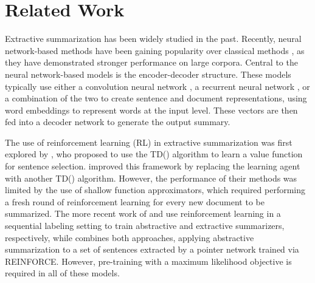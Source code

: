 \documentclass[11pt,a4paper]{article}
\begin{document}
\section{Related Work\label{sec:related-work}}
Extractive summarization has been widely studied in the past. Recently, neural network-based methods have been gaining popularity over classical methods \citep{tra_ext1_luhn1958automatic,tra_ext2_gong2001generic, tra_ext4_conroy2001text,tra_ext3_mihalcea2004textrank,tra_ext5_wong2008extractive}, as they have demonstrated stronger performance on large corpora. Central to the neural network-based models is the encoder-decoder structure. These models typically use either a convolution neural network \cite{cnn1_kalchbrenner2014convolutional,cnn2_kim2014convolutional,ext2_2015Yin,ext3_cao2015learning}, a recurrent neural network \cite{rnn2_chung2014gru,ext4_cheng2016neural,ext5_summarunner}, or a combination of the two \cite{DBLP:Narayan/2018,DBLP:conf/aaai/WuH18} to create sentence and document representations, using word embeddings \cite{we1_mikolov2013efficient,we2_pennington2014glove} to represent words at the input level. These vectors are then fed into a decoder network to generate the output summary. 

The use of reinforcement learning (RL) in extractive summarization was first explored by \citet{rl_ryang2012frameworkRL}, who proposed to use the TD() algorithm to learn a value function for sentence selection. \citet{rl_rioux2014fear} improved this framework by replacing the learning agent with another TD() algorithm. However, the performance of their methods was limited by the use of shallow function approximators, which required performing a fresh round of reinforcement learning for every new document to be summarized. The more recent work of \citet{abs5_paulus2017deep} and \citet{DBLP:conf/aaai/WuH18} use reinforcement learning in a sequential labeling setting to train abstractive and extractive summarizers, respectively, while \citet{chen2018abstractive} combines both approaches, applying abstractive summarization to a set of sentences extracted by a pointer network \citep{vinyals2015pointer} trained via REINFORCE.
However, pre-training with a maximum likelihood objective is required in all of these models.
\end{document}
